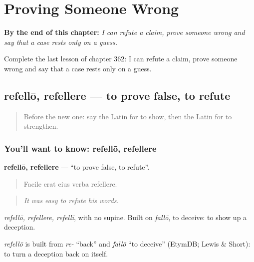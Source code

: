 
\chapter{Proving Someone Wrong}
\label{ch:la-proving-someone-wrong}

\begin{chapteropening}
\textbf{By the end of this chapter:} \emph{I can refute a claim, prove someone wrong and say that a case rests only on a guess.}

Complete the last lesson of chapter 362: I can refute a claim, prove someone wrong and say that a case rests only on a guess.
\end{chapteropening}

\section[refellō, refellere]{refellō, refellere — to prove false, to refute}

\label{lesson:LA-C362-refello}



\begin{quote}
Before the new one: say the Latin for to show, then the Latin for to strengthen.
\end{quote}

\subsection*{You'll want to know: refellō, refellere}
\textbf{refellō, refellere} — \textquotedblleft{}to prove false, to refute\textquotedblright{}.

\begin{quote}
Facile erat eius verba refellere.
\end{quote}

\begin{quote}
\emph{It was easy to refute his words.}
\end{quote}

\emph{refellō, refellere, refellī}, with no supine. Built on \emph{fallō}, to deceive: to show up a deception.

\begin{cousinweb}
\emph{refellō} is built from \emph{re-} \textquotedblleft{}back\textquotedblright{} and \emph{fallō} \textquotedblleft{}to deceive\textquotedblright{} (EtymDB; Lewis \& Short): to turn a deception back on itself.
\end{cousinweb}

